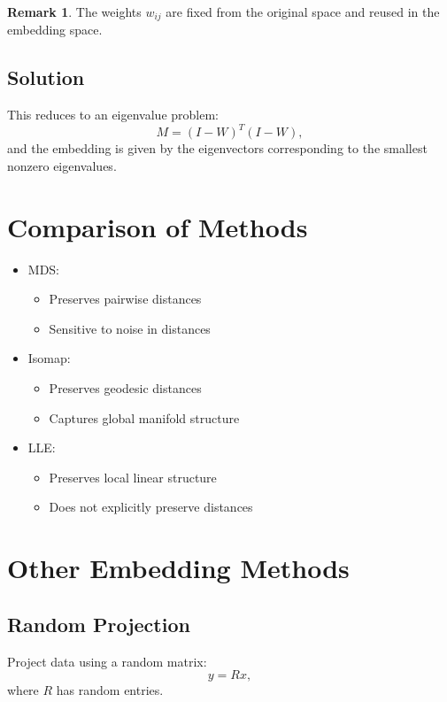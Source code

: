 \documentclass[12pt,oneside]{book}
\numberwithin{equation}{section}
\theoremstyle{definition}
\newtheorem{remark}{Remark}[section]
\theoremstyle{plain}
\theoremstyle{remark}
\begin{document}
\begin{remark}
The weights $w_{ij}$ are fixed from the original space and reused in the embedding space.
\end{remark}

\subsection{Solution}

This reduces to an eigenvalue problem:
\[
M = (I - W)^T (I - W),
\]
and the embedding is given by the eigenvectors corresponding to the smallest nonzero eigenvalues.

\section{Comparison of Methods}

\begin{itemize}
    \item MDS:
    \begin{itemize}
        \item Preserves pairwise distances
        \item Sensitive to noise in distances
    \end{itemize}
    \item Isomap:
    \begin{itemize}
        \item Preserves geodesic distances
        \item Captures global manifold structure
    \end{itemize}
    \item LLE:
    \begin{itemize}
        \item Preserves local linear structure
        \item Does not explicitly preserve distances
    \end{itemize}
\end{itemize}

\section{Other Embedding Methods}

\subsection{Random Projection}

Project data using a random matrix:
\[
y = R x,
\]
where $R$ has random entries.
\end{document}
